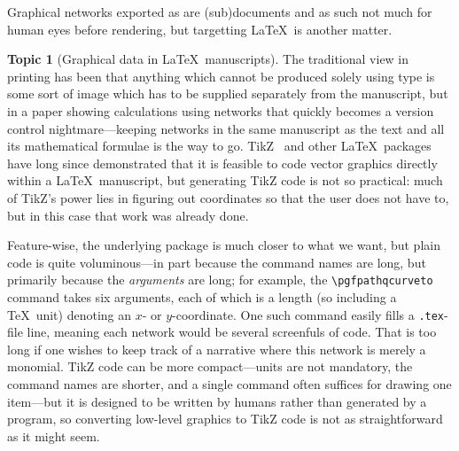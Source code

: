 \documentclass{article}
\theoremstyle{definition}
\newtheorem{topic}{Topic}
\begin{document}
Graphical networks exported as  are  
(sub)documents and as such not much for human eyes before rendering, 
but targetting \LaTeX\ is another matter.

\begin{topic}[Graphical data in \LaTeX\ manuscripts]
  The traditional view in printing has been that anything which 
  cannot be produced solely using type is some sort of image which 
  has to be supplied separately from the manuscript, but in a paper 
  showing calculations using networks that quickly becomes a version 
  control nightmare---keeping networks in the same manuscript as the 
  text and all its mathematical formulae is the way to go. 
  TikZ~\cite{TikZ-PGF} and other \LaTeX\ packages have long since 
  demonstrated that it is feasible to code vector graphics directly 
  within a \LaTeX\ manuscript, but generating TikZ code 
  is not so practical: much of TikZ's power lies in figuring out 
  coordinates so that the user does not have to, but in this case 
  that work was already done.
  
  Feature-wise, the underlying  package is much closer to 
  what we want, but plain  code is quite voluminous---in 
  part because the command names are long, but primarily because the 
  \emph{arguments} are long; for example, the \verb|\pgfpathqcurveto| 
  command takes six arguments, each of which is a length (so 
  including a \TeX\ unit) denoting an $x$- or $y$-coordinate. One 
  such command easily fills a \texttt{.tex}-file line, meaning each 
  network would be several screenfuls of code. That is too long if 
  one wishes to keep track of a narrative where this network is 
  merely a monomial. TikZ code can be more compact---units are not 
  mandatory, the command names are shorter, and a single command 
  often suffices for drawing one item---but it is designed to be 
  written by humans rather than generated by a program, so converting 
  low-level graphics to TikZ code is not as straightforward as it 
  might seem.
  

\end{topic}
\end{document}
